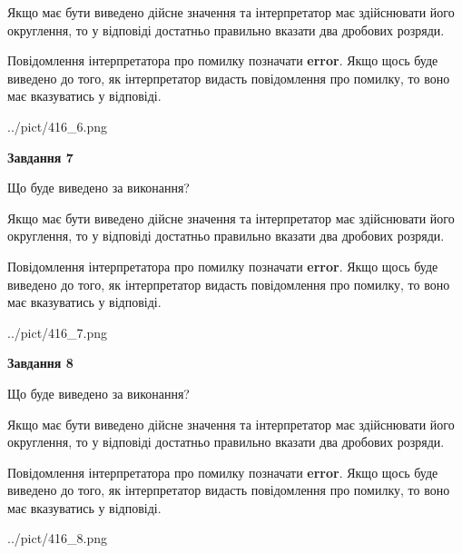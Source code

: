 \documentclass[12pt, ukrainian]{article}
\begin{document}
{\begin {Large}
Якщо має бути виведено дійсне значення та інтерпретатор має здійснювати його округлення, 
то у відповіді достатньо правильно вказати два дробових розряди.

Повідомлення інтерпретатора про помилку позначати \textbf{error}.
Якщо щось буде виведено до того, як інтерпретатор видасть повідомлення про помилку, 
то воно має вказуватись у відповіді. \par

\begin{center}
	{../pict/416_6.png}
\end{center}
\newpage

{\begin {center}\textbf{Завдання 7}\end {center}}\par
Що буде виведено за виконання? \par

Якщо має бути виведено дійсне значення та інтерпретатор має здійснювати його округлення, 
то у відповіді достатньо правильно вказати два дробових розряди.

Повідомлення інтерпретатора про помилку позначати \textbf{error}.
Якщо щось буде виведено до того, як інтерпретатор видасть повідомлення про помилку, 
то воно має вказуватись у відповіді. \par

\begin{center}
	{../pict/416_7.png}
\end{center}
\newpage

{\begin {center}\textbf{Завдання 8}\end {center}}\par
Що буде виведено за виконання? \par

Якщо має бути виведено дійсне значення та інтерпретатор має здійснювати його округлення, 
то у відповіді достатньо правильно вказати два дробових розряди.

Повідомлення інтерпретатора про помилку позначати \textbf{error}.
Якщо щось буде виведено до того, як інтерпретатор видасть повідомлення про помилку, 
то воно має вказуватись у відповіді. \par

\begin{center}
	{../pict/416_8.png}
\end{center}
\newpage


\end{Large}}
\end{document}
